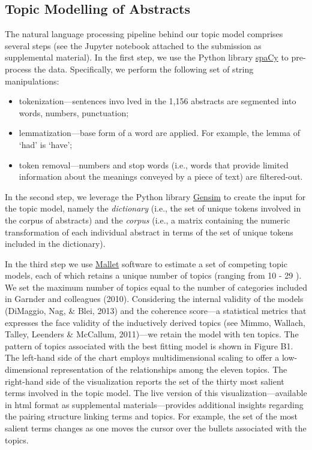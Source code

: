 \documentclass[english]{article}
\begin{document}
\begin{appendices}
\clearpage


\section{Topic Modelling of Abstracts}\label{appendix_b}

\noindent The natural language processing pipeline behind our topic model
comprises several steps (see the Jupyter notebook attached to the submission as
supplemental material). In the first step, we use the Python library
\href{https://spacy.io/}{spaCy} to pre-process the data. Specifically, we
perform the following set of string manipulations:

\begin{itemize}
	\item tokenization---sentences invo lved in the 1,156 abstracts are
		segmented into words, numbers, punctuation;
	\item lemmatization---base form of a word are applied. For example,
		the lemma of `had' is `have';
	\item token removal---numbers and stop words (i.e., words that provide
		limited information about the meanings conveyed by a piece of
	text) are filtered-out.

\end{itemize}

In the second step, we leverage the Python library
\href{https://radimrehurek.com/gensim/}{Gensim} to create the input for the
topic model, namely the \textit{dictionary} (i.e.,
the set of unique tokens involved in the corpus of abstracts) and the
\textit{corpus} (i.e., a matrix containing the numeric transformation of each
	individual abstract in terms of the set of unique tokens included in
the dictionary).

In the third step we use
\href{http://mallet.cs.umass.edu/topics.php}{Mallet} software to
estimate a set of competing topic models, each of which retains a unique
number of topics (ranging from 10 - 29 ). We set the maximum number of
topics equal to the number of categories included in Garnder and
colleagues (2010). Considering the internal validity of the models (DiMaggio,
Nag, \& Blei, 2013) and the coherence score---a statistical metrics
that expresses the face validity of the inductively derived
topics (see Mimmo, Wallach, Talley, Leenders \& McCallum, 2011)---we
retain the model with ten topics. The pattern of
topics associated with the best fitting model is shown in Figure B1.
The left-hand side of the chart employs multidimensional scaling to
offer a low-dimensional representation of the relationships among the
eleven topics. The right-hand side of the visualization reports the set
of the thirty most salient terms involved in the topic model. The live
version of this visualization---available in html format as supplemental
materials---provides additional insights regarding the pairing structure
linking terms and topics. For example, the set of the most salient terms
changes as one moves the cursor over the bullets associated with the
topics.


\end{appendices}
\end{document}
